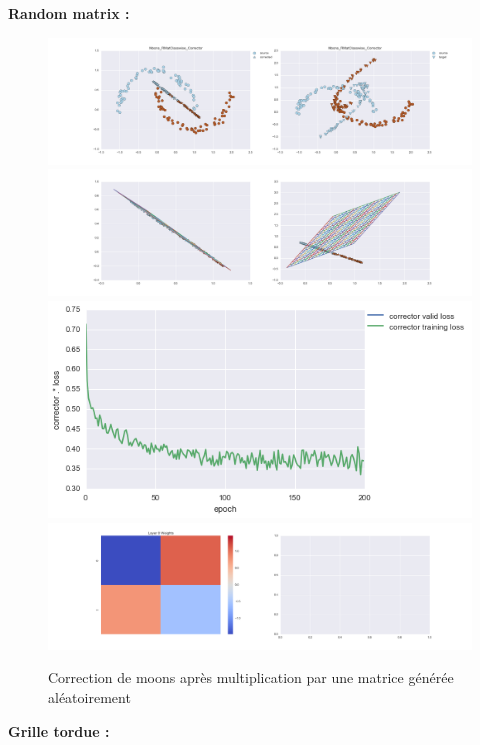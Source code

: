 {\Large \textbf{Random matrix :}}

\begin{figure}[H] %
\centering
\includegraphics[width=\linewidth]{fig/24-05-2016/moons/Moons_RMatClasswise_Corrector-DATA.png}
\includegraphics[width=\linewidth]{fig/24-05-2016/moons/Moons_RMatClasswise_Corrector-GridCheck.png}
\includegraphics[width=0.45\linewidth]{fig/24-05-2016/moons/Moons_RMatClasswise_Corrector-Learning_curve.png}
\includegraphics[width=\linewidth]{fig/24-05-2016/moons/Moons_RMatClasswise_Corrector-W.png}
\caption{Correction de moons après multiplication par une matrice générée aléatoirement}
\label{fig:recap-moons-RMat-classwise}
\end{figure}

{\Large \textbf{Grille tordue :}}


